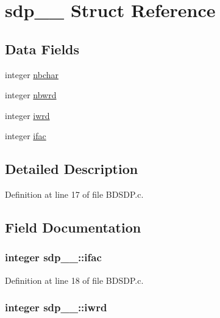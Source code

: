 \hypertarget{structsdp__1__}{}\section{sdp\+\_\+\_\+ Struct Reference}
\label{structsdp__1__}
\subsection*{Data Fields}
\begin{DoxyCompactItemize}
\item 
integer \hyperlink{structsdp__1___abd4cced29274448d358f409bf9366a26}{nbchar}
\item 
integer \hyperlink{structsdp__1___aa3327eb2ed6551a9256044f8c8b5d216}{nbwrd}
\item 
integer \hyperlink{structsdp__1___a8abc7e97596940d0e6ea20e46ca712a7}{iwrd}
\item 
integer \hyperlink{structsdp__1___a7df600b0bdf0afdb7500e2ee51b4ee69}{ifac}
\end{DoxyCompactItemize}


\subsection{Detailed Description}


Definition at line 17 of file B\+D\+S\+D\+P.\+c.



\subsection{Field Documentation}
\subsubsection[{\texorpdfstring{ifac}{ifac}}]{\setlength{\rightskip}{0pt plus 5cm}integer sdp\+\_\+\_\+\+::ifac}\hypertarget{structsdp__1___a7df600b0bdf0afdb7500e2ee51b4ee69}{}\label{structsdp__1___a7df600b0bdf0afdb7500e2ee51b4ee69}


Definition at line 18 of file B\+D\+S\+D\+P.\+c.

\subsubsection[{\texorpdfstring{iwrd}{iwrd}}]{\setlength{\rightskip}{0pt plus 5cm}integer sdp\+\_\+\_\+\+::iwrd}\hypertarget{structsdp__1___a8abc7e97596940d0e6ea20e46ca712a7}{}\label{structsdp__1___a8abc7e97596940d0e6ea20e46ca712a7}


